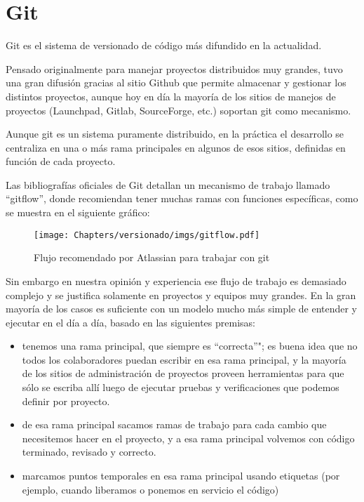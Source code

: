 \section{Git}\label{versionado-git}

Git es el sistema de versionado de código más difundido en la actualidad. 

Pensado originalmente para manejar proyectos distribuidos muy grandes, tuvo una gran difusión gracias al sitio Github que permite almacenar y gestionar los distintos proyectos, aunque hoy en día la mayoría de los sitios de manejos de proyectos (Launchpad, Gitlab, SourceForge, etc.) soportan git como mecanismo.

Aunque git es un sistema puramente distribuido, en la práctica el desarrollo se centraliza en una o más rama principales en algunos de esos sitios, definidas en función de cada proyecto.

Las bibliografías oficiales de Git detallan un mecanismo de trabajo llamado ``gitflow'', donde recomiendan tener muchas ramas con funciones específicas, como se muestra en el siguiente gráfico:

\begin{figure}
    \centering
    \texttt{[image: Chapters/versionado/imgs/gitflow.pdf]}
    \caption{Flujo recomendado por Atlassian para trabajar con git \cite{atlassian_gitflow}}
\end{figure}

Sin embargo en nuestra opinión y experiencia ese flujo de trabajo es demasiado complejo y se justifica solamente en proyectos y equipos muy grandes. En la gran mayoría de los casos es suficiente con un modelo mucho más simple de entender y ejecutar en el día a día, basado en las siguientes premisas:

\begin{itemize}
  \item tenemos una rama principal, que siempre es ``correcta''"; es buena idea que no todos los colaboradores puedan escribir en esa rama principal, y la mayoría de los sitios de administración de proyectos proveen herramientas para que sólo se escriba allí luego de ejecutar pruebas y verificaciones que podemos definir por proyecto.

  \item de esa rama principal sacamos ramas de trabajo para cada cambio que necesitemos hacer en el proyecto, y a esa rama principal volvemos con código terminado, revisado y correcto.

  \item marcamos puntos temporales en esa rama principal usando etiquetas  (por ejemplo, cuando liberamos o ponemos en servicio el código)
\end{itemize}

